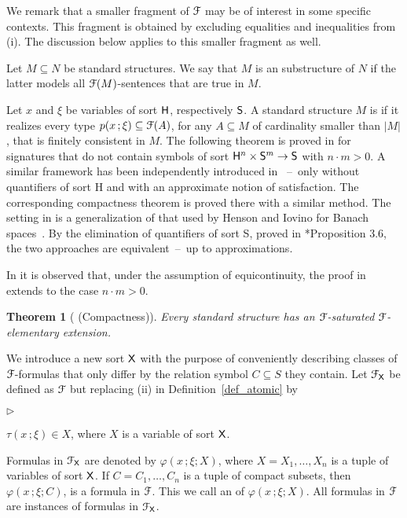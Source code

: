 \documentclass{amsproc}
\newcommand{\mylabel}[1]{{#1}\hfill}
\renewenvironment{itemize}
  {\begin{list}{$\triangleright$}{%
  \setlength{\parskip}{0mm}
  \setlength{\topsep}{.1\baselineskip}
  \setlength{\rightmargin}{0mm}
  \setlength{\listparindent}{0mm}
  \setlength{\itemindent}{0mm}
  \setlength{\labelwidth}{3ex}
  \setlength{\itemsep}{.1\baselineskip}
  \setlength{\parsep}{.1\baselineskip}
  \setlength{\partopsep}{0mm}
  \setlength{\labelsep}{1ex}
  \setlength{\leftmargin}{\labelwidth+\labelsep}
  \let\makelabel\mylabel}}{%
\end{list}}
\newcounter{thm}
\theoremstyle{mio}
\newtheorem{theorem}[thm]{Theorem}\tcolorboxenvironment{theorem}{mythm}
\renewcommand*{\emph}[1]{%
   \smash{\tikz[baseline]\node[rectangle, fill=teal!25, rounded corners, inner xsep=0.5ex, inner ysep=0.2ex, anchor=base, minimum height = 2.7ex]{\strut #1};}}
\begin{document}
We remark that a smaller fragment of ${\EuScript F}$ may be of interest in some specific contexts.
This fragment is obtained by excluding equalities and inequalities from (i).
The discussion below applies to this smaller fragment as well.

Let $M\subseteq N$ be standard structures.
We say that $M$ is an \emph{${\EuScript F}$-elementary\/} substructure of $N$ if the latter models all ${\EuScript F}(M)$-sentences that are true in $M$.

Let $x$ and $\xi$ be variables of sort ${\sf H}$, respectively ${\sf S}$.
A standard structure $M$ is \emph{${\EuScript F}$-saturated\/} if it realizes every type $p(x\,;\xi)\subseteq{\EuScript F}(A)$, for any $A\subseteq M$ of cardinality smaller than $|M|$, that is finitely consistent in $M$.
The following theorem is proved in \cite{clcl} for signatures that do not contain symbols of sort ${\sf H}^n\times{\sf S}^m\to {\sf S}$ with $n{\cdot}m>0$.
A similar framework has been independently introduced in \cite{CP}~--~only without quantifiers of sort {\sf H} and with an approximate notion of satisfaction.
The corresponding compactness theorem is proved there with a similar method.
The setting in \cite{CP} is a generalization of that used by Henson and Iovino for Banach spaces~\cite{HI}.
By the elimination of quantifiers of sort {\sf S}, proved in \cite{clcl}*{Proposition 3.6}, the two approaches are equivalent~--~up to approximations.

In \cite{Z} it is observed that, under the assumption of equicontinuity, the proof in \cite{clcl} extends to the case $n{\cdot}m> 0$.

\begin{theorem}[ (Compactness)]\label{thm_compactness}
  Every standard structure has an ${\EuScript F}$-saturated ${\EuScript F}$-elementary extension.
\end{theorem}

We introduce a new sort ${\sf X}$ with the purpose of conveniently describing classes of ${\EuScript F}$-for\-mulas that only differ by the relation symbol $C\subseteq S$ they contain.
Let ${\EuScript F}_{\sf X}$ be defined as ${\EuScript F}$ but replacing (ii) in Definition~\ref{def_atomic} by\smallskip

\begin{itemize}
  \item[iii.] $\tau(x\,;\xi)\in X$, where $X$ is a variable of sort ${\sf X}$.
\end{itemize}

Formulas in ${\EuScript F}_{\sf X}$ are denoted by $\varphi(x\,;\xi;X)$, where $X=X_1,\dots,X_n$ is a tuple of variables of sort ${\sf X}$.
If $C=C _1,\dots,C_n$ is a tuple of compact subsets, then $\varphi(x\,;\xi;C)$, is a formula in ${\EuScript F}$.
This we call an \emph{instance\/} of $\varphi(x\,;\xi;X)$.
All formulas in ${\EuScript F}$ are instances of formulas in ${\EuScript F}_{\sf X}$.
\end{document}
